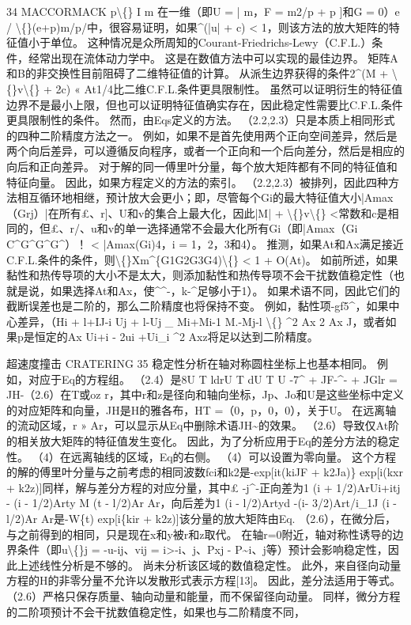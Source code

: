 \documentclass[UTF8,11pt,a4paper,openany,fontset=fandol]{ctexbook}
\begin{document}
34 MACCORMACK p\textbackslash\{\} I m 在一维（即U = | m，F = m2/p + p ]和G = 0）e / \textbackslash\{\}(e+p)m/p/中，很容易证明，如果\textasciicircum{}(|u| + c) < 1，则该方法的放大矩阵的特征值小于单位。 这种情况是众所周知的Courant-Friedrichs-Lewy（C.F.L.）条件，经常出现在流体动力学中。 这是在数值方法中可以实现的最佳边界。 矩阵A和B的非交换性目前阻碍了二维特征值的计算。 从派生边界获得的条件2\textasciicircum{}(M + \textbackslash\{\}v\textbackslash\{\} + 2c) « At1/4比二维C.F.L.条件更具限制性。 虽然可以证明衍生的特征值边界不是最小上限，但也可以证明特征值确实存在，因此稳定性需要比C.F.L.条件更具限制性的条件。 然而，由Eqs定义的方法。 （2.2,2.3）只是本质上相同形式的四种二阶精度方法之一。 例如，如果不是首先使用两个正向空间差异，然后是两个向后差异，可以遵循反向程序，或者一个正向和一个后向差分，然后是相应的向后和正向差异。 对于解的同一傅里叶分量，每个放大矩阵都有不同的特征值和特征向量。 因此，如果方程定义的方法的索引。 （2.2,2.3）被排列，因此四种方法相互循环地相继，预计放大会更小；即，尽管每个Gi的最大特征值大小|Amax（Grj）|在所有£、r]、U和v的集合上最大化，因此|M| + \textbackslash\{\}v\textbackslash\{\} <常数和c是相同的，但£、r/、u和v的单一选择通常不会最大化所有Gi（即|Amax（Gi C\textasciicircum{}G\textasciicircum{}G\textasciicircum{}G\textasciicircum{}）！ < |Amax(Gi)4，i = 1，2，3和4）。 推测，如果At和Ax满足接近C.F.L.条件的条件，则\textbackslash\{\}Xm\textasciicircum{}\{G1G2G3G4)\textbackslash\{\} < 1 + O(At)。 如前所述，如果黏性和热传导项的大小不是太大，则添加黏性和热传导项不会干扰数值稳定性（也就是说，如果选择At和Ax，使\textasciicircum{}\textasciicircum{}-，k-\textasciicircum{}足够小于1）。 如果术语不同，因此它们的截断误差也是二阶的，那么二阶精度也将保持不变。 例如，黏性项-gf5\textasciicircum{}，如果中心差异，（Hi + l+IJ-i Uj + l-Uj \_ Mi+Mi-1 M.-Mj-l \textbackslash\{\} \textasciicircum{}2 Ax 2 Ax J，或者如果p是恒定的Ax Ui+i - 2ui +Ui\_i \textasciicircum{}2 Axz将足以达到二阶精度。

超速度撞击 CRATERING 35 稳定性分析在轴对称圆柱坐标上也基本相同。 例如，对应于Eq的方程组。 （2.4）是8U T ldrU T dU T U -7\textasciicircum{} + JF-\textasciicircum{}- + JGlr = JH-（2.6）在T或oz r，其中r和z是径向和轴向坐标，Jp、Jo和U是这些坐标中定义的对应矩阵和向量，JH是H的雅各布，HT =（0，p，0，0），关于U。 在远离轴的流动区域，r » Ar，可以显示从Eq中删除术语JH\textasciitilde{}的效果。 （2.6）导致仅At阶的相关放大矩阵的特征值发生变化。 因此，为了分析应用于Eq的差分方法的稳定性。 （4）在远离轴线的区域，Eq的右侧。 （4）可以设置为零向量。 这个方程的解的傅里叶分量与之前考虑的相同波数fci和k2是-exp[it(kiJF + k2Ja)\} exp[i(kxr + k2z)]同样，解与差分方程的对应分量，其中£ -j\textasciicircum{}-正向差为1 (i + 1/2)ArUi+itj - (i - 1/2)Arty M (t - l/2)Ar Ar，向后差为1 (i - l/2)Artyd -(i- 3/2)Art/i\_1J (i - l/2)Ar Ar是-W\{t) exp[i\{kir + k2z)]该分量的放大矩阵由Eq. （2.6），在微分后，与之前得到的相同，只是现在x和y被r和z取代。 在轴r=0附近，轴对称性诱导的边界条件（即u\textbackslash\{\}j = -u-ij、vij = i>-i、j、Pxj - P\textasciitilde{}i、j等）预计会影响稳定性，因此上述线性分析是不够的。 尚未分析该区域的数值稳定性。 此外，来自径向动量方程的H的非零分量不允许以发散形式表示方程[13]。 因此，差分法适用于等式。 （2.6）严格只保存质量、轴向动量和能量，而不保留径向动量。 同样，微分方程的二阶项预计不会干扰数值稳定性，如果也与二阶精度不同，
\end{document}
